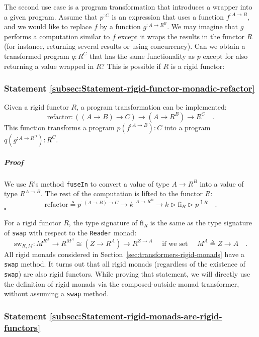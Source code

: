 The second use case is a program transformation that introduces a
wrapper into a given program. Assume that $p^{:C}$ is an expression
that uses a function $f^{:A\rightarrow B}$, and we would like to
replace $f$ by a function $g^{:A\rightarrow R^{B}}$. We may imagine
that $g$ performs a computation similar to $f$ except it wraps the
results in the functor $R$ (for instance, returning several results
or using concurrency). Can we obtain a transformed program $q:R^{C}$
that has the same functionality as $p$ except for also returning
a value wrapped in $R$? This is possible if $R$ is a rigid functor:

\subsubsection{Statement \label{subsec:Statement-rigid-functor-monadic-refactor}\ref{subsec:Statement-rigid-functor-monadic-refactor}}

Given a rigid functor $R$, a program transformation can be implemented:
\[
\text{refactor}:((A\rightarrow B)\rightarrow C)\rightarrow(A\rightarrow R^{B})\rightarrow R^{C}\quad.
\]
This function transforms a program $p(f^{:A\rightarrow B}):C$ into
a program $q(g^{:A\rightarrow R^{B}}):R^{C}$.

\subparagraph{Proof}

We use $R$\textsf{'}s method \lstinline!fuseIn! to convert a value of type
$A\rightarrow R^{B}$ into a value of type $R^{A\rightarrow B}$.
The rest of the computation is lifted to the functor $R$:
\[
\text{refactor}\triangleq p^{:\left(A\rightarrow B\right)\rightarrow C}\rightarrow k^{:A\rightarrow R^{B}}\rightarrow k\triangleright\text{fi}_{R}\triangleright p^{\uparrow R}\quad.
\]
$\square$

For a rigid functor $R$, the type signature of $\text{fi}_{R}$ is
the same as the type signature of \lstinline!swap! with respect to
the \lstinline!Reader! monad:
\[
\text{sw}_{R,M}:M^{R^{A}}\rightarrow R^{M^{A}}\cong(Z\rightarrow R^{A})\rightarrow R^{Z\rightarrow A}\quad\text{ if we set }\quad M^{A}\triangleq Z\rightarrow A\quad.
\]
All rigid monads considered in Section~\ref{sec:transformers-rigid-monads}
have a \lstinline!swap! method. It turns out that all rigid monads
(regardless of the existence of \lstinline!swap!) are also rigid
functors. While proving that statement, we will directly use the definition
of rigid monads via the composed-outside monad transformer, without
assuming a \lstinline!swap! method.

\subsubsection{Statement \label{subsec:Statement-rigid-monads-are-rigid-functors}\ref{subsec:Statement-rigid-monads-are-rigid-functors}}

